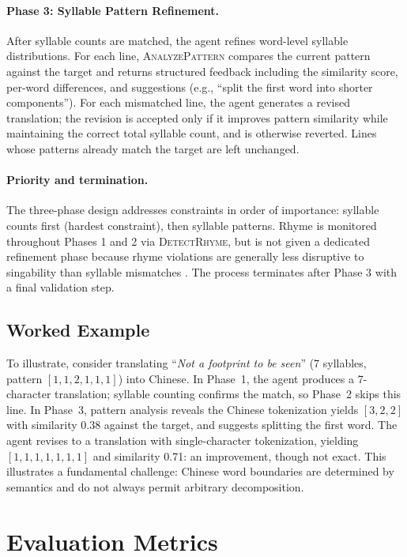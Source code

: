 \documentclass[11pt]{article}
\begin{document}
\paragraph{Phase 3: Syllable Pattern Refinement.}
After syllable counts are matched, the agent refines word-level syllable distributions.
For each line, \textsc{AnalyzePattern} compares the current pattern against the target and returns structured feedback including the similarity score, per-word differences, and suggestions (e.g., ``split the first word into shorter components'').
For each mismatched line, the agent generates a revised translation; the revision is accepted only if it improves pattern similarity while maintaining the correct total syllable count, and is otherwise reverted.
Lines whose patterns already match the target are left unchanged.

\paragraph{Priority and termination.}
The three-phase design addresses constraints in order of importance: syllable counts first (hardest constraint), then syllable patterns.
Rhyme is monitored throughout Phases 1 and 2 via \textsc{DetectRhyme}, but is not given a dedicated refinement phase because rhyme violations are generally less disruptive to singability than syllable mismatches \citep{low-2005-pentathlon}.
The process terminates after Phase 3 with a final validation step.

\subsection{Worked Example}

To illustrate, consider translating ``\emph{Not a footprint to be seen}'' (7 syllables, pattern $[1, 1, 2, 1, 1, 1]$) into Chinese.
In Phase~1, the agent produces a 7-character translation; syllable counting confirms the match, so Phase~2 skips this line.
In Phase~3, pattern analysis reveals the Chinese tokenization yields $[3, 2, 2]$ with similarity 0.38 against the target, and suggests splitting the first word.
The agent revises to a translation with single-character tokenization, yielding $[1, 1, 1, 1, 1, 1, 1]$ and similarity 0.71: an improvement, though not exact.
This illustrates a fundamental challenge: Chinese word boundaries are determined by semantics and do not always permit arbitrary decomposition.

\section{Evaluation Metrics}
\label{sec:eval}
\end{document}
